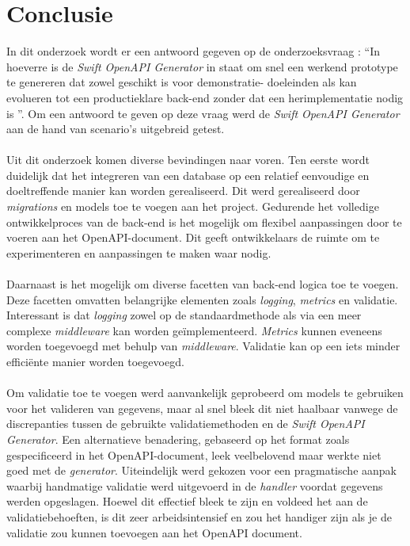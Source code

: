 
\chapter{Conclusie}%
\label{ch:conclusie}

In dit onderzoek wordt er een antwoord gegeven op de onderzoeksvraag : “In hoeverre is de \textit{Swift OpenAPI Generator} in staat om snel een werkend prototype te genereren dat zowel geschikt is voor demonstratie- doeleinden als kan evolueren tot een productieklare back-end zonder dat een herimplementatie nodig is ”. Om een antwoord te geven op deze vraag werd de \textit{Swift OpenAPI Generator} aan de hand van scenario’s uitgebreid getest. 
\\ \\
Uit dit onderzoek komen diverse bevindingen naar voren. Ten eerste wordt duidelijk dat het integreren van een database op een relatief eenvoudige en doeltreffende manier kan worden gerealiseerd. Dit werd gerealiseerd door \textit{migrations} en models toe te voegen aan het project. Gedurende het volledige ontwikkelproces van de back-end is het mogelijk om flexibel aanpassingen door te voeren aan het OpenAPI-document. Dit geeft ontwikkelaars de ruimte om te experimenteren en aanpassingen te maken waar nodig. 
\\ \\
Daarnaast is het mogelijk om diverse facetten van back-end logica toe te voegen. Deze facetten omvatten belangrijke elementen zoals \textit{logging}, \textit{metrics} en validatie. Interessant is dat \textit{logging} zowel op de standaardmethode als via een meer complexe \textit{middleware} kan worden geïmplementeerd. \textit{Metrics} kunnen eveneens worden toegevoegd met behulp van \textit{middleware}. Validatie kan op een iets minder efficiënte manier worden toegevoegd. 
\\ \\
Om validatie toe te voegen werd aanvankelijk geprobeerd om models te gebruiken voor het valideren van gegevens, maar al snel bleek dit niet haalbaar vanwege de discrepanties tussen de gebruikte validatiemethoden en de \textit{Swift OpenAPI Generator}. Een alternatieve benadering, gebaseerd op het format zoals gespecificeerd in het OpenAPI-document, leek veelbelovend maar werkte niet goed met de \textit{generator}. 
Uiteindelijk werd gekozen voor een pragmatische aanpak waarbij handmatige validatie werd uitgevoerd in de \textit{handler} voordat gegevens werden opgeslagen. Hoewel dit effectief bleek te zijn en voldeed het aan de validatiebehoeften, is dit zeer arbeidsintensief en zou het handiger zijn als je de validatie zou kunnen toevoegen aan het OpenAPI document. 
